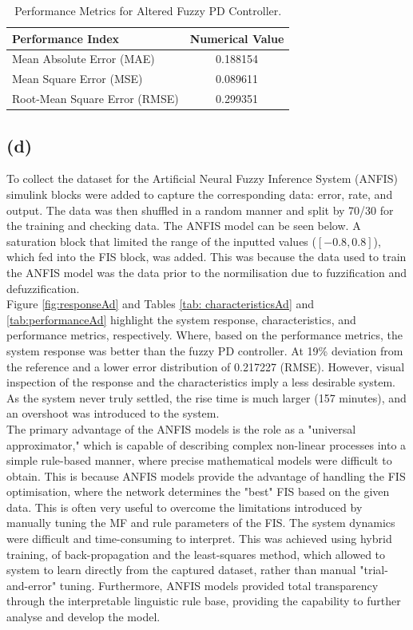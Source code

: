 \documentclass[12pt]{article}
\begin{document}
\begin{table}[H]
\centering
\begin{tabular}{|l|c|}
\hline
\textbf{Performance Index} & \textbf{Numerical Value} \\ \hline
Mean Absolute Error (MAE) & 0.188154 \\ \hline
Mean Square Error (MSE) & 0.089611 \\ \hline
Root-Mean Square Error (RMSE) &  0.299351 \\ \hline
\end{tabular}
\caption{Performance Metrics for Altered Fuzzy PD Controller.}
\label{tab:performanceAcnew}
\end{table}


\subsection{(d)}

To collect the dataset for the Artificial Neural Fuzzy Inference System (ANFIS) simulink blocks were added to capture the corresponding data: error, rate, and output.
The data was then shuffled in a random manner and split by 70/30 for the training and checking data.
The ANFIS model can be seen below.
A saturation block that limited the range of the inputted values ($[-0.8, 0.8]$), which fed into the FIS block, was added.
This was because the data used to train the ANFIS model was the data prior to the normilisation due to fuzzification and defuzzification.
\\

Figure \ref{fig:responseAd} and Tables \ref{tab: characteristicsAd} and \ref{tab:performanceAd} highlight the system response, characteristics, and performance metrics, respectively.
Where, based on the performance metrics, the system response was better than the fuzzy PD controller.
At 19\% deviation from the reference and a lower error distribution of 0.217227 (RMSE).
However, visual inspection of the response and the characteristics imply a less desirable system.
As the system never truly settled, the rise time is much larger (157 minutes), and an overshoot was introduced to the system.
\\

The primary advantage of the ANFIS models is the role as a "universal approximator," which is capable of describing complex non-linear processes into a simple rule-based manner, where precise mathematical models were difficult to obtain.
This is because ANFIS models provide the advantage of handling the FIS optimisation, where the network determines the "best" FIS based on the given data.
This is often very useful to overcome the limitations introduced by manually tuning the MF and rule parameters of the FIS.
The system dynamics were difficult and time-consuming to interpret.
This was achieved using hybrid training, of back-propagation and the least-squares method, which allowed to system to learn directly from the captured dataset, rather than manual "trial-and-error" tuning.
Furthermore, ANFIS models provided total transparency through the interpretable linguistic rule base, providing the capability to further analyse and develop the model.
\\
\end{document}
